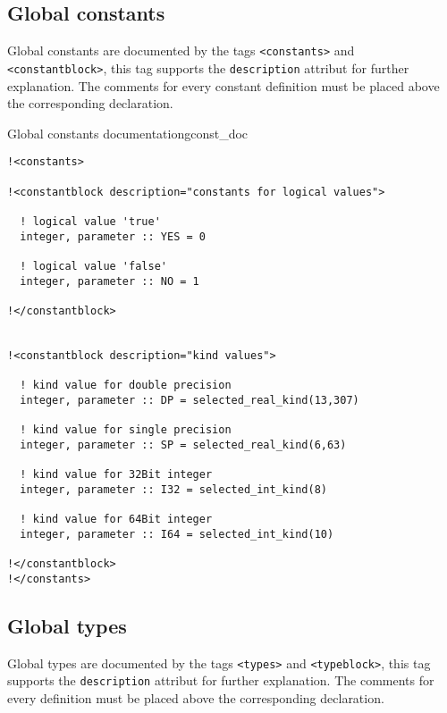 \subsection{Global constants}


Global constants are documented by the tags \verb+<constants>+ and 
\verb+<constantblock>+, this tag supports the \verb+description+ attribut
for further explanation. The comments for every constant definition must
be placed above the corresponding declaration.

\begin{code}{Global constants documentation}{gconst_doc}
\begin{verbatim}
!<constants>

!<constantblock description="constants for logical values">

  ! logical value 'true'
  integer, parameter :: YES = 0

  ! logical value 'false'
  integer, parameter :: NO = 1

!</constantblock>


!<constantblock description="kind values">

  ! kind value for double precision
  integer, parameter :: DP = selected_real_kind(13,307)

  ! kind value for single precision
  integer, parameter :: SP = selected_real_kind(6,63)

  ! kind value for 32Bit integer
  integer, parameter :: I32 = selected_int_kind(8)

  ! kind value for 64Bit integer
  integer, parameter :: I64 = selected_int_kind(10)

!</constantblock>
!</constants>
\end{verbatim}
\end{code}

\subsection{Global types}

Global types are documented by the tags \verb+<types>+ and 
\verb+<typeblock>+, this tag supports the \verb+description+ attribut
for further explanation. The comments for every definition must
be placed above the corresponding declaration.

